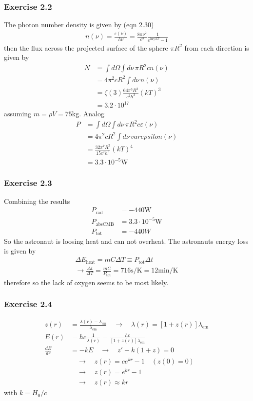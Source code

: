 \documentclass[10pt,a4paper]{book}
\theoremstyle{definition}
\begin{document}
\subsubsection{Exercise 2.2}
The photon number density is given by (eqn 2.30)
\begin{align}
n(\nu)=\frac{\varepsilon(\nu)}{h\nu}=\frac{8\pi\nu^2}{c^3}\frac{1}{e^{h\nu/kT}-1}
\end{align}
then the flux across the projected surface of the sphere $\pi R^2$ from each direction is given by  
\begin{align}
N&=\int d\Omega\int d\nu\,\pi R^2 cn(\nu)\\
&=4\pi^2 cR^2\int d\nu\, n(\nu)\\
&=\zeta(3)\frac{64\pi^3R^2}{c^2h^3}(kT)^3\\
&=3.2\cdot10^{17}
\end{align}
assuming $m=\rho V=75$kg. Analog
\begin{align}
P&=\int d\Omega\int d\nu\,\pi R^2 c\varepsilon(\nu)\\
&=4\pi^2 cR^2\int d\nu\, varepsilon(\nu)\\
&=\frac{32\pi^7R^2}{15c^2h^3}(kT)^4\\
&=3.3\cdot10^{-5}\text{W}
\end{align}

\subsubsection{Exercise 2.3}
Combining the results
\begin{align}
P_\text{rad}&=-440\text{W}\\
P_\text{absCMB}&=3.3\cdot10^{-5}\text{W}\\
P_\text{tot}&=-440W
\end{align}
So the astronaut is loosing heat and can not overheat.
The astronauts energy loss is given by
\begin{align}
\Delta E_\text{heat}=mC\Delta T\equiv P_\text{tot}\Delta t\\
\rightarrow \frac{\Delta t}{\Delta T}=\frac{mC}{P_\text{tot}}=716\text{s/K}=12\text{min/K}
\end{align}
therefore so the lack of oxygen seems to be most likely.

\subsubsection{Exercise 2.4}
\begin{align}
z(r)&=\frac{\lambda(r)-\lambda_\text{em}}{\lambda_\text{em}}\quad\rightarrow\quad\lambda(r)=[1+z(r)]\lambda_\text{em}\\
E(r)&=hc\frac{1}{\lambda(r)}=\frac{hc}{[1+z(r)]\lambda_\text{em}}\\
\frac{dE}{dr}&=-kE\quad\rightarrow\quad z'-k(1+z)=0\\
&\quad\rightarrow\quad z(r)=ce^{kr}-1 \quad(z(0)=0) \\
&\quad\rightarrow\quad z(r)=e^{kr}-1\\
&\quad\rightarrow\quad z(r)\approx kr
\end{align}
with $k=H_0/c$
\end{document}
